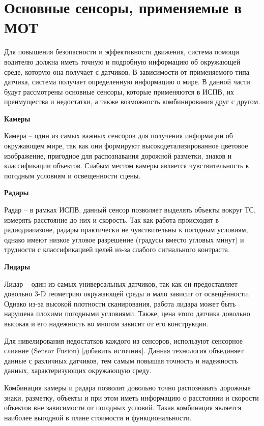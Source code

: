 \section{Основные сенсоры, применяемые в МОТ}

Для повышения безопасности и эффективности движения, система помощи водителю должна иметь точную и подробную информацию об окружающей среде, которую она получает с датчиков. В зависимости от применяемого типа датчика, система получает определенную информацию о мире. В данной части будут рассмотрены основные сенсоры, которые применяются в ИСПВ, их преимущества и недостатки, а также возможность комбинирования друг с другом.

\textbf{Камеры}

Камера -- один из самых важных сенсоров для получения информации об окружающем мире, так как они формируют высокодетализированное цветовое изображение, пригодное для распознавания дорожной разметки, знаков и классификации объектов. Слабым местом камеры является чувствительность к погодным условиям и освещенности сцены.
 
\textbf{Радары}

Радар -- в рамках ИСПВ, данный сенсор позволяет выделять объекты вокруг ТС, измерять расстояние до них и скорость. Так как работа происходит в радиодиапазоне, радары практически не чувствительны к погодным условиям, однако имеют низкое угловое разрешение (градусы вместо угловых минут) и трудности с классификацией целей из-за слабого сигнального контраста.

\textbf{Лидары}

 Лидар -- один из самых универсальных датчиков, так как он предоставляет довольно 3-D геометрию окружающей среды и мало зависит от освещённости. Однако из-за высокой плотности сканирования, работа лидара может быть нарушена плохими погодными условиями. Также, цена этого датчика довольно высокая и его надежность во многом зависит от его конструкции. 
 
Для нивелирования недостатков каждого из сенсоров, используют сенсорное слияние (Sensor Fusion) [добавить источник]. Данная технология объединяет данные с различных датчиков, тем самым повышая точность и надежность данных, характеризующих окружающую среду. 

Комбинация камеры и радара позволит довольно точно распознавать дорожные знаки, разметку, объекты и при этом иметь информацию о расстоянии и скорости объектов вне зависимости от погодных условий. Такая комбинация является наиболее выгодной в плане стоимости и функциональности. 

